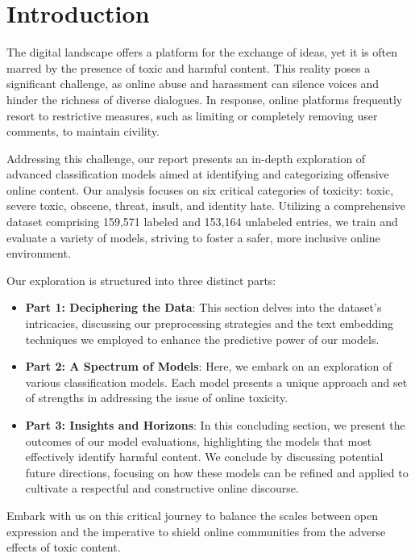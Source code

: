 \section{Introduction}

The digital landscape offers a platform for the exchange of ideas, yet it is often marred by the presence of toxic and harmful content. This reality poses a significant challenge, as online abuse and harassment can silence voices and hinder the richness of diverse dialogues. In response, online platforms frequently resort to restrictive measures, such as limiting or completely removing user comments, to maintain civility.

Addressing this challenge, our report presents an in-depth exploration of advanced classification models aimed at identifying and categorizing offensive online content. Our analysis focuses on six critical categories of toxicity: toxic, severe toxic, obscene, threat, insult, and identity hate. Utilizing a comprehensive dataset comprising 159,571 labeled and 153,164 unlabeled entries, we train and evaluate a variety of models, striving to foster a safer, more inclusive online environment.

Our exploration is structured into three distinct parts:
\begin{itemize}
    \item \textbf{Part 1: Deciphering the Data}: This section delves into the dataset's intricacies, discussing our preprocessing strategies and the text embedding techniques we employed to enhance the predictive power of our models.
    \item \textbf{Part 2: A Spectrum of Models}: Here, we embark on an exploration of various classification models. Each model presents a unique approach and set of strengths in addressing the issue of online toxicity.
    \item \textbf{Part 3: Insights and Horizons}: In this concluding section, we present the outcomes of our model evaluations, highlighting the models that most effectively identify harmful content. We conclude by discussing potential future directions, focusing on how these models can be refined and applied to cultivate a respectful and constructive online discourse.
\end{itemize}

Embark with us on this critical journey to balance the scales between open expression and the imperative to shield online communities from the adverse effects of toxic content.
